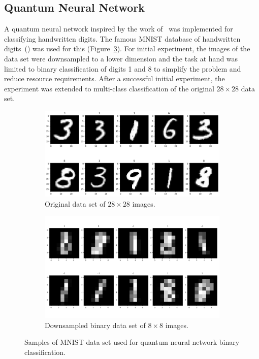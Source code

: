 \documentclass[a4paper,10pt]{article}
\begin{document}
\subsection{Quantum Neural Network}
A quantum neural network inspired by the work of~\cite{qnn-near-term} was implemented for classifying handwritten digits.
The famous MNIST database of handwritten digits~(\cite{mnist-digits}) was used for this (Figure~\ref{fig:mnist}).
For initial experiment, the images of the data set were downsampled to a lower dimension and the task at hand was limited to binary classification of digits 1 and 8 to simplify the problem and reduce resource requirements.
After a successful initial experiment, the experiment was extended to multi-class classification of the original $28 \times 28$ data set.
\begin{figure}[ht]
	\centering
	\begin{subfigure}{.5\textwidth}
		\centering
		\includegraphics[width=.925\linewidth]{figures/mnist_28x28.png}
		\caption{Original data set of $28 \times 28$ images.}
		\label{fig:mnist_28x28}
	\end{subfigure}%
	\begin{subfigure}{.5\textwidth}
		\centering
		\includegraphics[width=.925\linewidth]{figures/mnist_8x8}
		\caption{Downsampled binary data set of $8 \times 8$ images.}
		\label{fig:mnist_8x8}
	\end{subfigure}
	\caption{Samples of MNIST data set used for quantum neural network binary classification.}
	\label{fig:mnist}
\end{figure}
\end{document}
